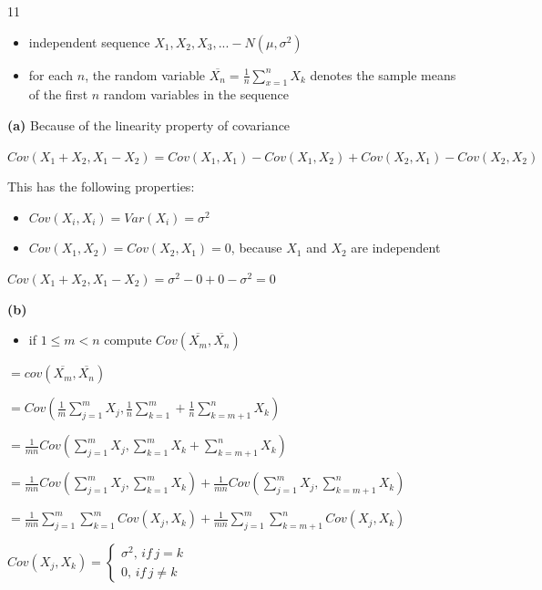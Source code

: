 \documentclass[12 pt]{article}
\begin{document}
    \begin{exercise}{11}
    \hfill

    \begin{itemize}
        \item independent sequence $X_1, X_2, X_3, ... - N(\mu, \sigma^2)$
        \item for each $n$, the random variable $\overline{X_n} = \frac{1}{n} \sum_{x=1}^n X_k$ denotes the sample means of the first $n$ random variables in the sequence
    \end{itemize}

    \hfill

    \textbf{(a)} Because of the linearity property of covariance
    
    $Cov(X_1 + X_2, X_1 - X_2) = Cov(X_1, X_1) - Cov(X_1, X_2) + Cov(X_2, X_1) - Cov(X_2, X_2)$

    This has the following properties:
    \begin{itemize}
        \item $Cov(X_i, X_i) = Var(X_i) = \sigma^2$
        \item $Cov(X_1, X_2) = Cov(X_2, X_1) = 0$, because $X_1$ and $X_2$ are independent
    \end{itemize}

    \hfill

    $Cov(X_1 + X_2, X_1 - X_2) = \sigma^2 - 0 + 0 - \sigma^2 = 0$

    \hfill

    \textbf{(b)}
    \begin{itemize}
        \item if $1 \leq m < n$ compute $Cov(\overline{X_m}, \overline{X_n})$
    \end{itemize}

    $= cov(\overline{X_m}, \overline{X_n})$

    $= Cov(\frac{1}{m} \sum_{j=1}^{m} X_j, \frac{1}{n} \sum_{k=1}^{m} + \frac{1}{n}\sum_{k=m+1}^{n} X_k)$

    $= \frac{1}{mn} Cov(\sum_{j=1}^{m} X_j, \sum_{k=1}^{m} X_k + \sum_{k=m+1}^{n} X_k)$

    $= \frac{1}{mn} Cov(\sum_{j=1}^{m} X_j, \sum_{k=1}^{m} X_k) + \frac{1}{mn} Cov(\sum_{j=1}^{m} X_j, \sum_{k=m+1}^{n} X_k)$

    $= \frac{1}{mn} \sum_{j=1}^{m} \sum_{k=1}^{m} Cov(X_j, X_k) + \frac{1}{mn} \sum_{j=1}^{m} \sum_{k=m+1}^{n} Cov(X_j, X_k)$

    $Cov(X_j, X_k) = \begin{cases}
        \sigma^2, \, if \, j=k \\
        0, \, if \, j \neq k
    \end{cases}$


\end{exercise}
\end{document}
